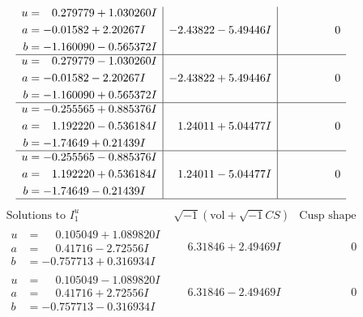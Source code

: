 \documentclass[1p]{elsarticle_modified}
\theoremstyle{definition}
\newcommand{\I}{\sqrt{-1}}
\begin{document}
$$\begin{array}{c|c|c}
\begin{aligned}
u &= \phantom{-}0.279779 + 1.030260 I \\
a &= -0.01582 + 2.20267 I \\
b &= -1.160090 - 0.565372 I\end{aligned}
 & -2.43822 - 5.49446 I & \phantom{-0.000000 } 0 \\ \hline\begin{aligned}
u &= \phantom{-}0.279779 - 1.030260 I \\
a &= -0.01582 - 2.20267 I \\
b &= -1.160090 + 0.565372 I\end{aligned}
 & -2.43822 + 5.49446 I & \phantom{-0.000000 } 0 \\ \hline\begin{aligned}
u &= -0.255565 + 0.885376 I \\
a &= \phantom{-}1.192220 - 0.536184 I \\
b &= -1.74649 + 0.21439 I\end{aligned}
 & \phantom{-}1.24011 + 5.04477 I & \phantom{-0.000000 } 0 \\ \hline\begin{aligned}
u &= -0.255565 - 0.885376 I \\
a &= \phantom{-}1.192220 + 0.536184 I \\
b &= -1.74649 - 0.21439 I\end{aligned}
 & \phantom{-}1.24011 - 5.04477 I & \phantom{-0.000000 } 0\\
 \hline 
 \end{array}$$\newpage$$\begin{array}{c|c|c}  
\text{Solutions to }I^u_{1}& \I (\text{vol} + \sqrt{-1}CS) & \text{Cusp shape}\\
 \hline 
\begin{aligned}
u &= \phantom{-}0.105049 + 1.089820 I \\
a &= \phantom{-}0.41716 - 2.72556 I \\
b &= -0.757713 + 0.316934 I\end{aligned}
 & \phantom{-}6.31846 + 2.49469 I & \phantom{-0.000000 } 0 \\ \hline\begin{aligned}
u &= \phantom{-}0.105049 - 1.089820 I \\
a &= \phantom{-}0.41716 + 2.72556 I \\
b &= -0.757713 - 0.316934 I\end{aligned}
 & \phantom{-}6.31846 - 2.49469 I & \phantom{-0.000000 } 0 \\ \hline\begin{aligned}

\end{aligned}
\end{array}$$
\end{document}
